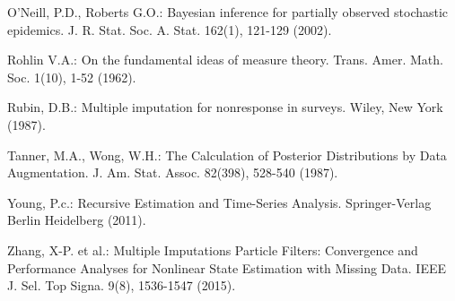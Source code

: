\begin{thebibliography}{}
O'Neill, P.D., Roberts G.O.: Bayesian inference for partially observed stochastic epidemics. J. R. Stat. Soc. A. Stat. 162(1), 121-129 (2002).

Rohlin V.A.: On the fundamental ideas of measure theory.  Trans.
Amer. Math. Soc. 1(10), 1-52 (1962).

Rubin, D.B.: Multiple imputation for nonresponse in surveys. Wiley, New York (1987).

Tanner, M.A., Wong, W.H.: The Calculation of Posterior Distributions by Data Augmentation. J. Am. Stat. Assoc. 82(398), 528-540 (1987).

Young, P.c.: Recursive Estimation and Time-Series Analysis. Springer-Verlag Berlin Heidelberg (2011).

Zhang, X-P. et al.: Multiple Imputations Particle Filters: Convergence and Performance Analyses for Nonlinear State Estimation with Missing Data. IEEE J. Sel. Top Signa. 9(8), 1536-1547 (2015).

\end{thebibliography}


\clearpage
\appendix

